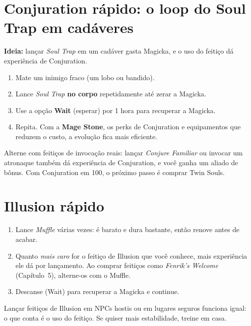 \documentclass[11pt,a4paper,oneside,openany]{book}
\newcommand{\magia}[1]{\textit{\textcolor{SoulCairnPurple}{#1}}}
\newcommand{\perk}[1]{\textsf{\textcolor{SoulCairnPurple}{#1}}}
\begin{document}
\section{Conjuration rápido: o loop do Soul Trap em cadáveres}
\begin{exploit}
\textbf{Ideia:} lançar \magia{Soul Trap} em um cadáver gasta Magicka, e o uso do feitiço dá experiência de Conjuration.
\begin{enumerate}
  \item Mate um inimigo fraco (um lobo ou bandido).
  \item Lance \magia{Soul Trap} \textbf{no corpo} repetidamente até zerar a Magicka.
  \item Use a opção \textbf{Wait} (esperar) por 1 hora para recuperar a Magicka.
  \item Repita. Com a \textbf{Mage Stone}, os \perk{perks} de Conjuration e equipamentos que reduzem o custo, a evolução fica mais eficiente.
\end{enumerate}
\end{exploit}

\begin{dica}
Alterne com feitiços de invocação reais: lançar \magia{Conjure Familiar} ou invocar um atronaque também dá experiência de Conjuration, e você ganha um aliado de bônus. Com Conjuration em 100, o próximo passo é comprar \perk{Twin Souls}.
\end{dica}

\section{Illusion rápido}
\begin{enumerate}
  \item Lance \magia{Muffle} várias vezes: é barato e dura bastante, então renove antes de acabar.
  \item Quanto \emph{mais caro} for o feitiço de Illusion que você conhece, mais experiência ele dá por lançamento. Ao comprar feitiços como \magia{Fenrik's Welcome} (Capítulo~5), alterne-os com o Muffle.
  \item Descanse (Wait) para recuperar a Magicka e continue.
\end{enumerate}

\begin{dica}
Lançar feitiços de Illusion em NPCs hostis ou em lugares seguros funciona igual: o que conta é o uso do feitiço. Se quiser mais estabilidade, treine em casa.
\end{dica}
\end{document}
